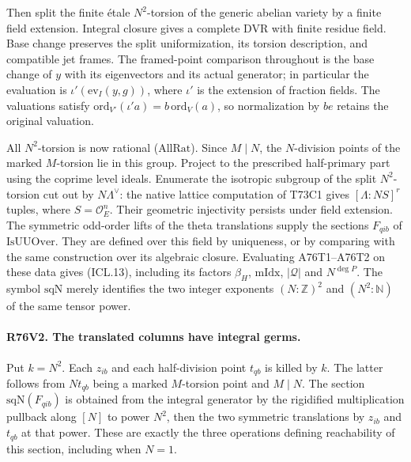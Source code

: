 Then split the finite \'etale $N^2$-torsion of the generic abelian
variety by a finite field extension. Integral closure gives a
complete DVR with finite residue field. Base change preserves the
split uniformization, its torsion description, and compatible
jet frames. The framed-point comparison throughout is the base
change of $y$ with its eigenvectors and its actual generator;
in particular the evaluation is $\iota'(\mathrm{ev}_I(y,g))$,
where $\iota'$ is the extension of fraction fields. The valuations
satisfy $\mathrm{ord}_{V'}(\iota'a)=b\,\mathrm{ord}_V(a)$,
so normalization by $be$ retains the original valuation.

All $N^2$-torsion is now rational ($\mathrm{AllRat}$). Since
$M\mid N$, the $N$-division points of the marked $M$-torsion
lie in this group. Project to the prescribed half-primary part
using the coprime level ideals. Enumerate the isotropic subgroup
of the split $N^2$-torsion cut out by $N\Lambda^\vee$: the
native lattice computation of T73C1 gives $[\Lambda:NS]^r$
tuples, where $S=\mathcal O_E^n$. Their geometric injectivity
persists under field extension. The symmetric odd-order lifts
of the theta translations supply the sections $F_{qib}$ of
$\mathrm{IsUUOver}$. They are defined over this field by
uniqueness, or by comparing with the same construction over its
algebraic closure. Evaluating A76T1--A76T2 on these data gives
(ICL.13), including its factors $\beta_H$, $\mathrm{mIdx}$,
$|\mathcal Q|$ and $N^{\deg P}$. The symbol $\mathrm{sqN}$
merely identifies the two integer exponents $(N:\mathbb Z)^2$
and $(N^2:\mathbb N)$ of the same tensor power.

\paragraph{R76V2. The translated columns have integral germs.}
Put $k=N^2$. Each $z_{ib}$ and each half-division point $t_{qb}$
is killed by $k$. The latter follows from $Nt_{qb}$ being a
marked $M$-torsion point and $M\mid N$. The section
$\mathrm{sqN}(F_{qib})$ is obtained from the integral generator
by the rigidified multiplication pullback along $[N]$ to power
$N^2$, then the two symmetric translations by $z_{ib}$ and
$t_{qb}$ at that power. These are exactly the three operations
defining reachability of this section, including when $N=1$.

